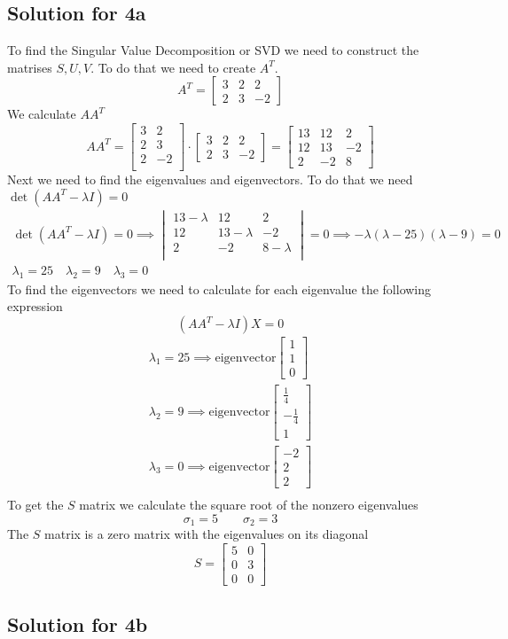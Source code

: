 \documentclass[a4paper,fleqn,12pt]{article}
\begin{document}
\subsection{Solution for 4a}
To find the Singular Value Decomposition or SVD we need to construct the matrises $S, U, V$. To do that we need to create $A^T$.
$$
A^T = \begin{bmatrix}
3 & 2 & 2 \\
2 & 3 & -2
\end{bmatrix}
$$
We calculate $AA^T$
$$
AA^T = 
\begin{bmatrix}
3 & 2 \\
2 & 3 \\
2 & -2 \\
\end{bmatrix} \cdot
\begin{bmatrix}
3 & 2 & 2 \\
2 & 3 & -2
\end{bmatrix} = 
\begin{bmatrix}
13 & 12 & 2 \\
12 & 13 & -2 \\
2 & -2 & 8
\end{bmatrix}
$$
Next we need to find the eigenvalues and eigenvectors. To do that we need $\det (AA^T - \lambda I) = 0$
\begin{gather*}
\det (AA^T - \lambda I) = 0 \implies 
\begin{vmatrix}
13-\lambda & 12 & 2 \\
12 & 13-\lambda & -2 \\
2 & -2 & 8-\lambda \\
\end{vmatrix} = 0 \implies -\lambda (\lambda - 25)(\lambda-9) = 0 \\
\lambda_1 = 25 \quad \lambda_2 = 9 \quad \lambda_3 = 0 
\end{gather*}
To find the eigenvectors we need to calculate for each eigenvalue the following expression
$$
(AA^T - \lambda I ) X = 0
$$
\begin{gather*}
\lambda_1 = 25 \implies \text{eigenvector} \begin{bmatrix}1 \\ 1 \\ 0  \end{bmatrix}\\
\lambda_2 = 9 \implies \text{eigenvector} \begin{bmatrix}\frac{1}{4} \\ -\frac{1}{4} \\ 1  \end{bmatrix}\\
\lambda_3 = 0 \implies \text{eigenvector} \begin{bmatrix}-2 \\ 2 \\ 2  \end{bmatrix}\\
\end{gather*}
To get the $S$ matrix we calculate the square root of the nonzero eigenvalues
$$
\sigma_1 = 5 \qquad \sigma_2 = 3 
$$
The $S$ matrix is a zero matrix with the eigenvalues on its diagonal
$$
S = \begin{bmatrix}
5 & 0 \\
0 & 3 \\
0 & 0
 \end{bmatrix}
$$
\subsection{Solution for 4b}
\end{document}
